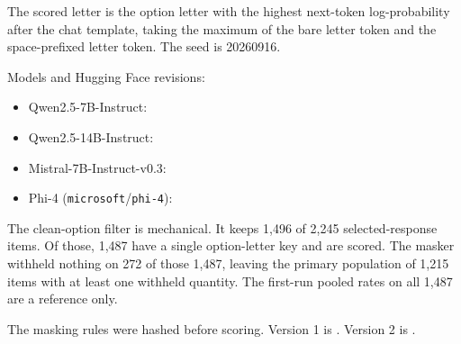 The scored letter is the option letter with the highest next-token log-probability after the chat template, taking the maximum of the bare letter token and the space-prefixed letter token. The seed is 20260916.

Models and Hugging Face revisions:
\begin{itemize}
\item Qwen2.5-7B-Instruct: 
\item Qwen2.5-14B-Instruct: 
\item Mistral-7B-Instruct-v0.3: 
\item Phi-4 (\texttt{microsoft}/\allowbreak\texttt{phi-4}): 
\end{itemize}

The clean-option filter is mechanical. It keeps 1{,}496 of 2{,}245 selected-response items.
Of those, 1{,}487 have a single option-letter key and are scored. The masker withheld nothing on 272 of those 1{,}487, leaving the primary population of 1{,}215 items with at least one withheld quantity. The first-run pooled rates on all 1{,}487 are a reference only.

The masking rules were hashed before scoring.
Version 1 is .
Version 2 is .

